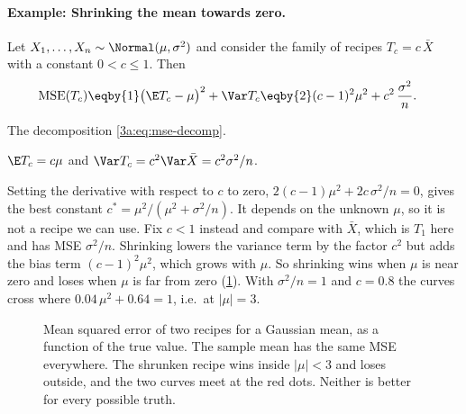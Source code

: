 \paragraph{Example: Shrinking the mean towards zero.}
\label{3a:ex:shrinkage}
Let $X_1,\dots,X_n\sim\Normal(\mu,\sigma^2)$ and consider the family of
recipes $T_c=c\,\bar X$ with a constant $0<c\le1$. Then
\begin{align*}
  \operatorname{MSE}(T_c)
  &\eqby{1} \bigl(\E T_c-\mu\bigr)^2+\Var T_c
   \eqby{2} (c-1)^2\mu^2+c^2\,\frac{\sigma^2}{n}.
\end{align*}
\begin{explain}
  \item The decomposition \eqref{3a:eq:mse-decomp}.
  \item $\E T_c=c\mu$ and $\Var T_c=c^2\Var\bar X=c^2\sigma^2/n$.
\end{explain}
Setting the derivative with respect to $c$ to zero,
$2(c-1)\mu^2+2c\,\sigma^2/n=0$, gives the best constant
$c^\ast=\mu^2/(\mu^2+\sigma^2/n)$. It depends on the unknown $\mu$, so it is
not a recipe we can use. Fix $c<1$ instead and compare with $\bar X$, which
is $T_1$ here and has MSE $\sigma^2/n$. Shrinking lowers the variance term
by the factor $c^2$ but adds the bias term $(c-1)^2\mu^2$, which grows with
$\mu$. So shrinking wins when $\mu$ is near zero and loses when $\mu$ is far
from zero (\cref{3a:fig:mse-crossing}). With $\sigma^2/n=1$ and $c=0.8$ the
curves cross where $0.04\,\mu^2+0.64=1$, i.e.\ at $|\mu|=3$.

\begin{figure}[htbp]
\centering
{}
\caption{Mean squared error of two recipes for a Gaussian mean, as a function
of the true value. The sample mean has the same MSE everywhere. The shrunken
recipe wins inside $|\mu|<3$ and loses outside, and the two curves meet at the
red dots. Neither is better for every possible truth.}
\label{3a:fig:mse-crossing}
\end{figure}

